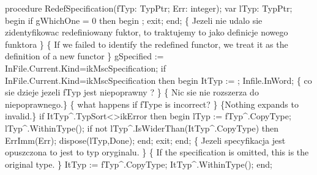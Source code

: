 \nwenddocs{}\endmoddef\nwstartdeflinemarkup{}\nwenddeflinemarkup
procedure RedefSpecification(fTyp: TypPtr; Err: integer);
var
   lTyp: TypPtr;
begin
   if gWhichOne = 0 then
   begin
      ;
      exit;
   end;
   \{ Jezeli nie udalo sie zidentyfikowac redefiniowany fuktor,
     to traktujemy to jako definicje nowego funktora
   \}
   \{ If we failed to identify the redefined functor,
     we treat it as the definition of a new functor \}
   gSpecified := InFile.Current.Kind=ikMscSpecification;
   if InFile.Current.Kind=ikMscSpecification then
   begin
      ItTyp := ;
      Infile.InWord;
      \{ co sie dzieje jezeli fTyp jest niepoprawny ? \}
      \{ Nic sie nie rozszerza do niepoprawnego.\}
      \{ what happens if fType is incorrect? \}
      \{Nothing expands to invalid.\}
      if ItTyp^.TypSort<>ikError then
      begin
         lTyp := fTyp^.CopyType;
         lTyp^.WithinType();
         if not lTyp^.IsWiderThan(ItTyp^.CopyType) then ErrImm(Err);
         dispose(lTyp,Done);
      end;
      exit;
   end;
   \{ Jezeli specyfikacja jest opuszczona to jest to typ oryginalu. \}
   \{ If the specification is omitted, this is the original type. \}
   ItTyp := fTyp^.CopyType;
   ItTyp^.WithinType();
end;
\nwendcode{}%

